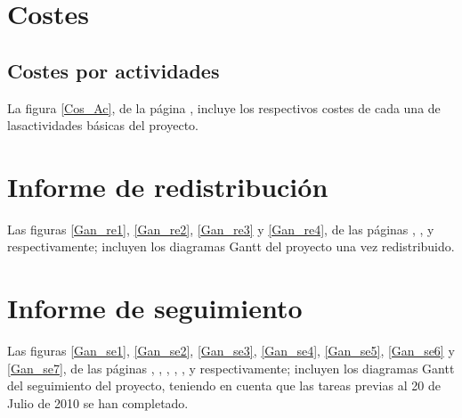 \documentclass[11pt,a4paper,spanish,twoside]{book}
\begin{document}
\section{Costes}

\subsection{Costes por actividades}
La figura \ref{Cos_Ac}, de la página \pageref{Cos_Ac}, incluye los
respectivos costes de cada una de lasactividades básicas del proyecto. 

\begin{sidewaystable}
\end{sidewaystable}

\section{Informe de redistribución}
Las figuras \ref{Gan_re1}, \ref{Gan_re2}, \ref{Gan_re3} y \ref{Gan_re4}, de
las páginas \pageref{Gan_re1}, \pageref{Gan_re2}, \pageref{Gan_re3} y
\pageref{Gan_re4} respectivamente; incluyen los diagramas Gantt del proyecto
una vez redistribuido.

\begin{sidewaystable}
\end{sidewaystable}

\begin{sidewaystable}
\end{sidewaystable}

\begin{sidewaystable}
\end{sidewaystable}

\begin{sidewaystable}
\end{sidewaystable}

\section{Informe de seguimiento}
Las figuras \ref{Gan_se1}, \ref{Gan_se2}, \ref{Gan_se3}, \ref{Gan_se4},
\ref{Gan_se5}, \ref{Gan_se6} y \ref{Gan_se7}, de las páginas
\pageref{Gan_se1}, \pageref{Gan_se2}, \pageref{Gan_se3}, \pageref{Gan_se4},
\pageref{Gan_se5}, \pageref{Gan_se6} y \pageref{Gan_se7} respectivamente;
incluyen los diagramas Gantt del seguimiento del proyecto, teniendo en cuenta
que las tareas previas al 20 de Julio de 2010 se han completado.
\end{document}
